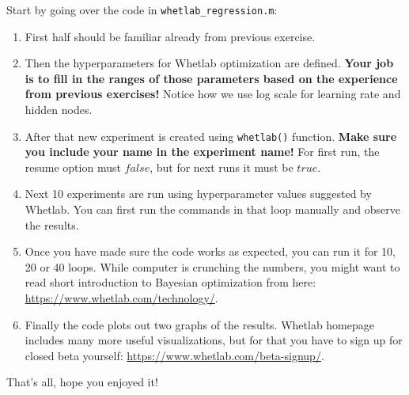\documentclass[a4paper,11pt]{article}
\begin{document}
 Start by going over the code in \texttt{whetlab\_regression.m}:

\begin{enumerate}
	\item First half should be familiar already from previous exercise.
	\item Then the hyperparameters for Whetlab optimization are defined. \textbf{Your job is to fill in the ranges of those parameters based on the experience from previous exercises!} Notice how we use log scale for learning rate and hidden nodes.
	\item After that new experiment is created using \texttt{whetlab()} function. \textbf{Make sure you include your name in the experiment name!} For first run, the resume option must $false$, but for next runs it must be $true$.
	\item Next 10 experiments are run using hyperparameter values suggested by Whetlab. You can first run the commands in that loop manually and observe the results.
	\item Once you have made sure the code works as expected, you can run it for 10, 20 or 40 loops. While computer is crunching the numbers, you might want to read short introduction to Bayesian optimization from here: \url{https://www.whetlab.com/technology/}.
	\item Finally the code plots out two graphs of the results. Whetlab homepage includes many more useful visualizations, but for that you have to sign up for closed beta yourself: \url{https://www.whetlab.com/beta-signup/}.
\end{enumerate}

That's all, hope you enjoyed it!
\end{document}
